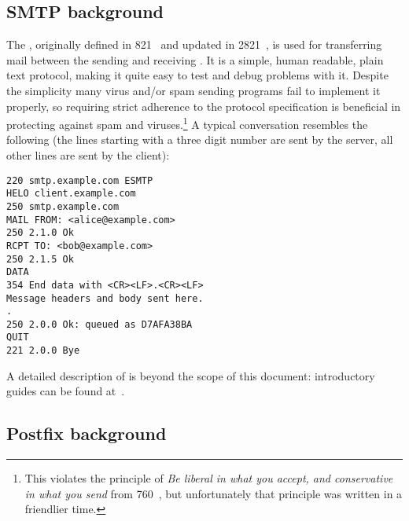 \documentclass[a4paper,12pt,draft]{article}
\begin{document}
\subsection{SMTP background}
\label{SMTP background}

The \SMTPlong, originally defined in \RFC{} 821~\cite{RFC821} and updated
in \RFC{} 2821~\cite{RFC2821}, is used for transferring mail between the
sending and receiving \MTA\@.  It is a simple, human readable, plain text
protocol, making it quite easy to test and debug problems with it.  Despite
the simplicity many virus and/or spam sending programs fail to implement it
properly, so requiring strict adherence to the protocol specification is
beneficial in protecting against spam and viruses.\footnote{This violates
the principle of \textit{Be liberal in what you accept, and conservative in
what you send\/} from \RFC{} 760~\cite{rfc760}, but unfortunately that
principle was written in a friendlier time.}  A typical \SMTP{}
conversation resembles the following (the lines starting with a three digit
number are sent by the server, all other lines are sent by the client):

\begin{verbatim}
220 smtp.example.com ESMTP
HELO client.example.com
250 smtp.example.com
MAIL FROM: <alice@example.com>
250 2.1.0 Ok
RCPT TO: <bob@example.com>
250 2.1.5 Ok
DATA
354 End data with <CR><LF>.<CR><LF>
Message headers and body sent here.
.
250 2.0.0 Ok: queued as D7AFA38BA
QUIT
221 2.0.0 Bye
\end{verbatim}

A detailed description of \SMTP{} is beyond the scope of this document:
introductory guides can be found at~\cite{smtp-intro-01, smtp-intro-02}.

\subsection{Postfix background}
\end{document}
